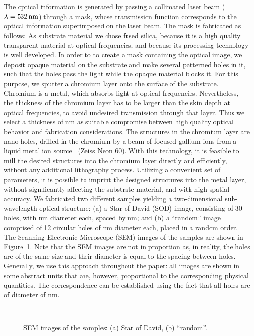 The optical information is generated by passing a collimated laser
beam ($\lambda = \unit[532]{nm}$) through a mask, whose transmission function
corresponds to the optical information superimposed on the laser
beam. The mask is fabricated as follows: As substrate material we
chose fused silica, because it is a high quality transparent material
at optical frequencies, and because its processing technology is well
developed. In order to to create a mask containing the optical image,
we deposit opaque material on the substrate and make several patterned
holes in it, such that the holes pass the light while the opaque
material blocks it. For this purpose, we sputter a chromium layer onto
the surface of the substrate. Chromium is a metal, which absorbs light
at optical frequencies. Nevertheless, the thickness of the chromium
layer has to be larger than the skin depth at optical frequencies, to
avoid undesired transmission through that layer. Thus we select a
thickness of \unit[100]{nm} as suitable compromise between high quality
optical behavior and fabrication considerations. The structures in the
chromium layer are nano-holes, drilled in the chromium by a beam of
focused gallium ions from a liquid metal ion
source~ (Zeiss Neon
60). With this technology, it is feasible to mill the desired
structures into the chromium layer directly and efficiently, without
any additional lithography process. Utilizing a convenient set of
parameters, it is possible to imprint the designed structures into the
metal layer, without significantly affecting the substrate material,
and with high spatial accuracy.  We fabricated two different samples
yielding a two-dimensional sub-wavelength optical structure: (a) a
Star of David (SOD) image, consisting of 30 holes, with \unit[100]{nm}
diameter each, spaced by \unit[100]{nm}; and (b) a ``random'' image comprised of 12
circular holes of \unit[100]{nm} diameter each, placed in a random order. The
Scanning Electronic Microscope (SEM) images of the samples are shown
in Figure~\ref{fig:sem-images}. Note that the SEM images are not in
proportion as, in reality, the holes are of the same size and their
diameter is equal to the spacing between holes. Generally, we
use this approach throughout the paper: all images are shown in some
abstract units that are, however, proportional to the corresponding
physical quantities. The correspondence can be established using the
fact that all holes are of diameter of \unit[100]{nm}.
\begin{figure}[H]
  \centering
  \\
  \caption[Test images]{SEM images of the samples: (a) Star of David, (b)
    ``random''.}
  \label{fig:sem-images}
\end{figure}

